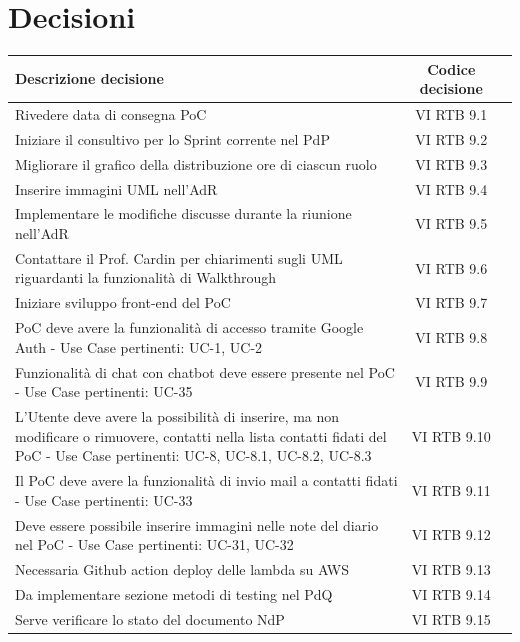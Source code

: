 \documentclass[a4paper,12pt]{article}
\newcommand{\ignoreglossary}{}
\begin{document}
\section{Decisioni}
\begin{center}
\small
\renewcommand{\arraystretch}{1.2} 
\begin{tabular}{|p{}|c|c|}
\hline
\rowcolor{gray!60} 
\textbf{Descrizione decisione} & \textbf{Codice decisione} \\
\hline
\rowcolor{white}
Rivedere data di consegna PoC & VI \ignoreglossary{RTB} 9.1 \\
\hline
\rowcolor{gray!20}
Iniziare il consultivo per lo Sprint corrente nel PdP & VI \ignoreglossary{RTB} 9.2 \\
\hline
\rowcolor{white}
Migliorare il grafico della distribuzione ore di ciascun ruolo & VI \ignoreglossary{RTB} 9.3 \\
\hline
\rowcolor{gray!20}
Inserire immagini UML nell'AdR & VI \ignoreglossary{RTB} 9.4 \\
\hline
\rowcolor{white}
Implementare le modifiche discusse durante la riunione nell'AdR & VI \ignoreglossary{RTB} 9.5 \\
\hline
\rowcolor{gray!20}
Contattare il Prof. Cardin per chiarimenti sugli UML riguardanti la funzionalità di Walkthrough & VI \ignoreglossary{RTB} 9.6 \\
\hline
\rowcolor{white}
Iniziare sviluppo front-end del PoC & VI \ignoreglossary{RTB} 9.7 \\
\hline
\rowcolor{gray!20}
PoC deve avere la funzionalità di accesso tramite Google Auth - Use Case pertinenti: UC-1, UC-2 & VI \ignoreglossary{RTB} 9.8 \\
\hline
\rowcolor{white}
Funzionalità di chat con chatbot deve essere presente nel PoC - Use Case pertinenti: UC-35 & VI \ignoreglossary{RTB} 9.9 \\
\hline
\rowcolor{gray!20}
L'Utente deve avere la possibilità di inserire, ma non modificare o rimuovere, contatti nella lista contatti fidati del PoC - Use Case pertinenti: UC-8, UC-8.1, UC-8.2, UC-8.3 & VI \ignoreglossary{RTB} 9.10 \\
\hline
\rowcolor{white}
Il PoC deve avere la funzionalità di invio mail a contatti fidati - Use Case pertinenti: UC-33 & VI \ignoreglossary{RTB} 9.11 \\
\hline
\rowcolor{gray!20}
Deve essere possibile inserire immagini nelle note del diario nel PoC - Use Case pertinenti: UC-31, UC-32 & VI \ignoreglossary{RTB} 9.12 \\
\hline
\rowcolor{white}
Necessaria Github action deploy delle lambda su AWS & VI \ignoreglossary{RTB} 9.13 \\
\hline
\rowcolor{gray!20}
Da implementare sezione metodi di testing nel PdQ & VI \ignoreglossary{RTB} 9.14 \\
\hline
\rowcolor{white}
Serve verificare lo stato del documento NdP & VI \ignoreglossary{RTB} 9.15 \\
\hline
\end{tabular}
\end{center}
\pagebreak
\end{document}
